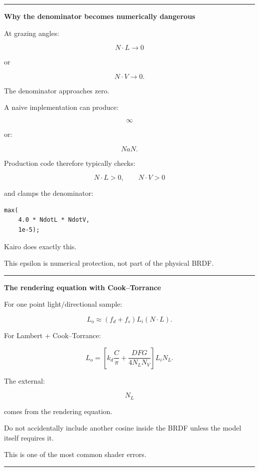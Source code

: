\begin{center}\rule{0.5\linewidth}{0.5pt}\end{center}

\textbf{Why the denominator becomes numerically dangerous}

At grazing angles:

\[
N\cdot L\rightarrow0
\]

or

\[
N\cdot V\rightarrow0.
\]

The denominator approaches zero.

A naive implementation can produce:

\[
\infty
\]

or:

\[
NaN.
\]

Production code therefore typically checks:

\[
N\cdot L>0,
\qquad
N\cdot V>0
\]

and clamps the denominator:

\begin{verbatim}
max(
    4.0 * NdotL * NdotV,
    1e-5);
\end{verbatim}

Kairo does exactly this.

This epsilon is numerical protection, not part of the physical BRDF.

\begin{center}\rule{0.5\linewidth}{0.5pt}\end{center}

\textbf{The rendering equation with Cook--Torrance}

For one point light/directional sample:

\[
L_o
\approx
\left(
f_d+f_s
\right)
L_i
(N\cdot L).
\]

For Lambert + Cook--Torrance:

\[
L_o
=
\left[
k_d\frac{C}{\pi}
+
\frac{DFG}
{4N_LN_V}
\right]
L_iN_L.
\]

The external:

\[
N_L
\]

comes from the rendering equation.

Do not accidentally include another cosine inside the BRDF unless the model itself requires it.

This is one of the most common shader errors.

\begin{center}\rule{0.5\linewidth}{0.5pt}\end{center}

